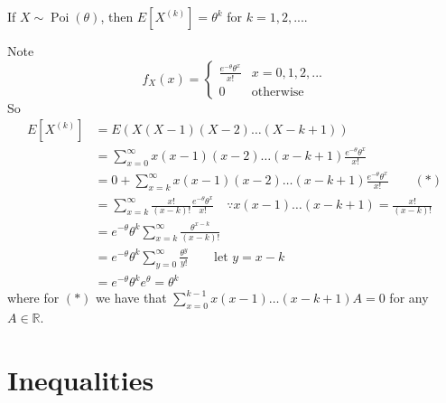 \documentclass[notoc,notitlepage]{tufte-book}
\DeclareMathOperator{\Poi}{Poi }
\begin{document}
\begin{eg}
  If $X \sim \Poi(\theta)$, then $E[ X^{(k)} ] = \theta^k$ for $k = 1, 2, ...$.

  \begin{solution}
    Note
    \begin{equation*}
      f_X (x) = \begin{cases}
        \frac{e^{-\theta} \theta^x}{x!} & x = 0, 1, 2, ... \\
        0                               & \text{otherwise}
      \end{cases}
    \end{equation*}
    So
    \begin{align*}
      E[ X^{(k)} ]
        &= E( X(X-1)(X-2)\hdots(X-k+1) ) \\
        &= \sum_{x = 0}^{\infty} x(x-1)(x-2)\hdots(x-k+1) \frac{e^{-\theta} \theta^x}{x!} \\
        &= 0 + \sum_{x = k}^{\infty} x(x-1)(x-2)\hdots(x-k+1) \frac{e^{-\theta} \theta^x}{x!} \qquad (*) \\
        &= \sum_{x = k}^{\infty} \frac{x!}{(x - k)!} \frac{e^{-\theta} \theta^x}{x!} \quad \because x(x-1)\hdots(x-k+1)=\frac{x!}{(x - k)!}\\
        &= e^{-\theta} \theta^k \sum_{x = k}^{\infty} \frac{\theta^{x - k}}{(x - k)!} \\
        &= e^{-\theta} \theta^k \sum_{y = 0}^{\infty} \frac{\theta^y}{y!} \qquad \text{let } y = x - k \\
        &= e^{-\theta} \theta^k e^{\theta} = \theta^k
    \end{align*}
    where for $(*)$ we have that $\sum_{x = 0}^{k - 1} x(x-1)\hdots(x-k+1) A = 0$ for any $A \in \mathbb{R}$.
  \end{solution}
\end{eg}



\section{Inequalities}%
\label{sec:inequalities}
\end{document}
